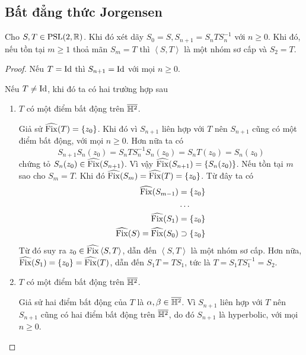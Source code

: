 \subsection{Bất đẳng thức Jorgensen}
\begin{lem}\label{lem 3.4.6}
    Cho $S, T \in \operatorname{PSL}(2,\mathbb{R})$. Khi đó xét dãy $S_0 = S, S_{n+1} = S_nTS_n^{-1}$ với $n\geq 0$. Khi đó, nếu tồn tại $m \geq 1$ thoả mãn $S_m = T$ thì  $\left<S,T\right>$ là một nhóm sơ cấp và $S_2 = T$.
\end{lem}
\begin{proof}
    Nếu $T = \operatorname{Id}$ thì $S_{n+1} = \operatorname{Id}$ với mọi $n \geq 0$.

    Nếu $T \neq \operatorname{Id}$, khi đó ta có hai trường hợp sau
    \begin{enumerate}
        \item $T$ có một điểm bất động trên $\overline{\mathbb{H}^2}$.

        Giả sử $\widehat{\operatorname{Fix}}(T) = \{z_0\}$. Khi đó vì $S_{n+1}$ liên hợp với $T$ nên $S_{n+1}$ cũng có một điểm bất động, với mọi $n \geq 0$.
        Hơn nữa ta có
        \[S_{n+1}S_n(z_0) = S_nTS_n^{-1}S_n(z_0) = S_nT(z_0) = S_n(z_0)\]
        chứng tỏ $S_n(z_0) \in \widehat{\operatorname{Fix}}(S_{n+1})$. Vì vậy $\widehat{\operatorname{Fix}}(S_{n+1}) = \{S_n(z_0)\}$. Nếu tồn tại $m$ sao cho $S_m = T$. Khi đó $\widehat{\operatorname{Fix}}(S_m) = \widehat{\operatorname{Fix}}(T) = \{z_0\}$. Từ đây ta có
        \begin{align*}
            \widehat{\operatorname{Fix}}(S_{m-1}) &= \{z_0\}\\
            &\ldots  \\
            \widehat{\operatorname{Fix}}(S_{1}) &= \{z_0\}\\
            \widehat{\operatorname{Fix}}(S) = \widehat{\operatorname{Fix}}(S_{0}) &\supset \{z_0\}
        \end{align*}
        Từ đó suy ra $z_0 \in \widehat{\operatorname{Fix}}\left<S, T\right>$, dẫn đến $\left<S, T\right>$ là một nhóm sơ cấp. Hơn nữa, $\widehat{\operatorname{Fix}}(S_{1}) = \{z_0\} = \widehat{\operatorname{Fix}}(T)$, dẫn đến $S_1T= T S_1$, tức là $T = S_1TS_1^{-1} = S_2$.
        \item $T$ có một điểm bất động trên $\overline{\mathbb{H}^2}$.

        Giả sử hai điểm bất động của $T$ là $\alpha, \beta \in \overline{\mathbb{H}^2}$. Vì $S_{n+1}$ liên hợp với $T$ nên $S_{n+1}$ cũng có hai điểm bất động trên $\overline{\mathbb{H}^2}$, do đó $S_{n+1}$ là hyperbolic, với mọi $n \geq 0$.


\end{enumerate}
\end{proof}

